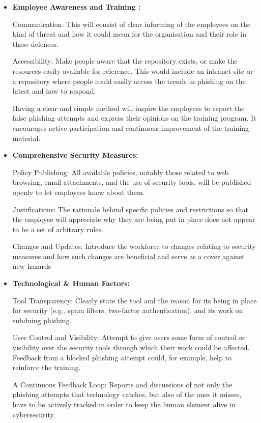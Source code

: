 \begin{itemize}
    \item \textbf{Employee Awareness and Training :} 
    
    Communication: This will consist of clear informing of the employees on the kind of threat and how it could mean for the organisation and their role in these defences.
    
Accessibility: Make people aware that the repository exists, or make the resources easily available for reference. This would include an intranet site or a repository where people could easily access the trends in phishing on the latest and how to respond.

Having a clear and simple method will inspire the employees to report the false phishing attempts and express their opinions on the training program. It encourages active participation and continuous improvement of the training material.


     \item \textbf{Comprehensive Security Measures: }
     
     Policy Publishing: All available policies, notably those related to web browsing, email attachments, and the use of security tools, will be published openly to let employees know about them.
     
Justifications: The rationale behind specific policies and restrictions so that the employee will appreciate why they are being put in place does not appear to be a set of arbitrary rules.

Changes and Updates: Introduce the workforce to changes relating to security measures and how such changes are beneficial and serve as a cover against new hazards

     \item \textbf{Technological \& Human Factors: } 
     
     Tool Transparency: Clearly state the tool and the reason for its being in place for security (e.g., spam filters, two-factor authentication), and its work on subduing phishing. 
     
User Control and Visibility: Attempt to give users some form of control or visibility over the security tools through which their work could be affected. Feedback from a blocked phishing attempt could, for example, help to reinforce the training.

A Continuous Feedback Loop: Reports and discussions of not only the phishing attempts that technology catches, but also of the ones it misses, have to be actively tracked in order to keep the human element alive in cybersecurity.



\end{itemize}
